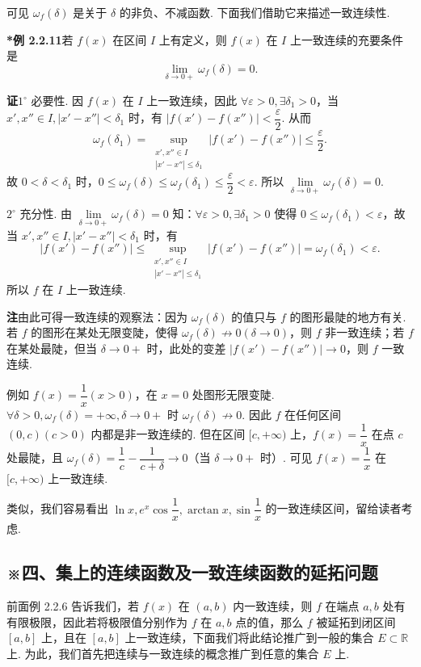 \documentclass[UTF8,12pt,a4paper,fontset=fandol]{ctexart}
\begin{document}
可见 $\omega_f(\delta)$ 是关于 $\delta$ 的非负、不减函数. 下面我们借助它来描述一致连续性.

\noindent\textbf{*例 2.2.11}\quad 若 $f(x)$ 在区间 $I$ 上有定义，则 $f(x)$ 在 $I$ 上一致连续的充要条件是
\[
  \lim_{\delta\to0+}\omega_f(\delta)=0.
\]

\noindent\textbf{证}\quad $1^\circ$ 必要性. 因 $f(x)$ 在 $I$ 上一致连续，因此 $\forall\varepsilon>0,\exists\delta_1>0$，当 $x',x''\in I,|x'-x''|<\delta_1$ 时，有 $|f(x')-f(x'')|<\dfrac\varepsilon2$. 从而
\[
  \omega_f(\delta_1)=\sup_{\substack{x',x''\in I\\ |x'-x''|\le\delta_1}}|f(x')-f(x'')|\le\frac\varepsilon2.
\]
故 $0<\delta<\delta_1$ 时，$0\le\omega_f(\delta)\le\omega_f(\delta_1)\le\dfrac\varepsilon2<\varepsilon$. 所以 $\lim\limits_{\delta\to0+}\omega_f(\delta)=0$.

$2^\circ$ 充分性. 由 $\lim\limits_{\delta\to0+}\omega_f(\delta)=0$ 知：$\forall\varepsilon>0,\exists\delta_1>0$ 使得 $0\le\omega_f(\delta_1)<\varepsilon$，故当 $x',x''\in I,|x'-x''|<\delta_1$ 时，有
\[
  |f(x')-f(x'')|\le
  \sup_{\substack{x',x''\in I\\ |x'-x''|\le\delta_1}}|f(x')-f(x'')|
  =\omega_f(\delta_1)<\varepsilon.
\]
所以 $f$ 在 $I$ 上一致连续.

\noindent\textbf{注}\quad 由此可得一致连续的观察法：因为 $\omega_f(\delta)$ 的值只与 $f$ 的图形最陡的地方有关. 若 $f$ 的图形在某处无限变陡，使得 $\omega_f(\delta)\not\to0(\delta\to0)$，则 $f$ 非一致连续；若 $f$ 在某处最陡，但当 $\delta\to0+$ 时，此处的变差 $|f(x')-f(x'')|\to0$，则 $f$ 一致连续.

例如 $f(x)=\dfrac1x(x>0)$，在 $x=0$ 处图形无限变陡. $\forall\delta>0,\omega_f(\delta)=+\infty,\delta\to0+$ 时 $\omega_f(\delta)\not\to0$. 因此 $f$ 在任何区间 $(0,c)(c>0)$ 内都是非一致连续的. 但在区间 $[c,+\infty)$ 上，$f(x)=\dfrac1x$ 在点 $c$ 处最陡，且 $\omega_f(\delta)=\dfrac1c-\dfrac1{c+\delta}\to0$（当 $\delta\to0+$ 时）. 可见 $f(x)=\dfrac1x$ 在 $[c,+\infty)$ 上一致连续.

类似，我们容易看出 $\ln x,e^x\cos\dfrac1x,\arctan x,\sin\dfrac1x$ 的一致连续区间，留给读者考虑.

\subsection*{※四、集上的连续函数及一致连续函数的延拓问题}

前面例 2.2.6 告诉我们，若 $f(x)$ 在 $(a,b)$ 内一致连续，则 $f$ 在端点 $a,b$ 处有有限极限，因此若将极限值分别作为 $f$ 在 $a,b$ 点的值，那么 $f$ 被延拓到闭区间 $[a,b]$ 上，且在 $[a,b]$ 上一致连续，下面我们将此结论推广到一般的集合 $E\subset\mathbb{R}$ 上. 为此，我们首先把连续与一致连续的概念推广到任意的集合 $E$ 上.
\end{document}

